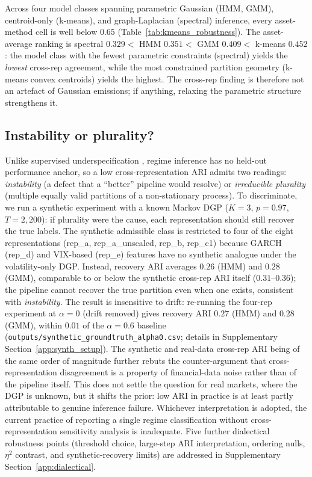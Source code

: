 \documentclass[preprint,12pt,authoryear]{elsarticle}
\begin{document}
Across four model classes spanning parametric Gaussian (HMM, GMM), centroid-only (k-means), and graph-Laplacian (spectral) inference, every asset-method cell is well below $0.65$ (Table~\ref{tab:kmeans_robustness}). The asset-average ranking is spectral $0.329 <$ HMM $0.351 <$ GMM $0.409 <$ k-means $0.452$: the model class with the fewest parametric constraints (spectral) yields the \emph{lowest} cross-rep agreement, while the most constrained partition geometry (k-means convex centroids) yields the highest. The cross-rep finding is therefore not an artefact of Gaussian emissions; if anything, relaxing the parametric structure strengthens it.

\subsection{Instability or plurality?}
\label{sec:discussion}

Unlike supervised underspecification \citep{DAmouretal2022}, regime inference has no held-out performance anchor, so a low cross-representation ARI admits two readings: \emph{instability} (a defect that a ``better'' pipeline would resolve) or \emph{irreducible plurality} (multiple equally valid partitions of a non-stationary process). To discriminate, we run a synthetic experiment with a known Markov DGP ($K=3$, $p=0.97$, $T=2{,}200$): if plurality were the cause, each representation should still recover the true labels. The synthetic admissible class is restricted to four of the eight representations (rep\_a, rep\_a\_unscaled, rep\_b, rep\_c1) because GARCH (rep\_d) and VIX-based (rep\_e) features have no synthetic analogue under the volatility-only DGP. Instead, recovery ARI averages $0.26$ (HMM) and $0.28$ (GMM), comparable to or below the synthetic cross-rep ARI itself ($0.31$--$0.36$); the pipeline cannot recover the true partition even when one exists, consistent with \emph{instability}. The result is insensitive to drift: re-running the four-rep experiment at $\alpha=0$ (drift removed) gives recovery ARI $0.27$ (HMM) and $0.28$ (GMM), within $0.01$ of the $\alpha=0.6$ baseline (\texttt{outputs/synthetic\_groundtruth\_alpha0.csv}; details in Supplementary Section~\ref{app:synth_setup}). The synthetic and real-data cross-rep ARI being of the same order of magnitude further rebuts the counter-argument that cross-representation disagreement is a property of financial-data noise rather than of the pipeline itself. This does not settle the question for real markets, where the DGP is unknown, but it shifts the prior: low ARI in practice is at least partly attributable to genuine inference failure. Whichever interpretation is adopted, the current practice of reporting a single regime classification without cross-representation sensitivity analysis is inadequate. Five further dialectical robustness points (threshold choice, large-step ARI interpretation, ordering nulls, $\eta^2$ contrast, and synthetic-recovery limits) are addressed in Supplementary Section~\ref{app:dialectical}.
\end{document}
